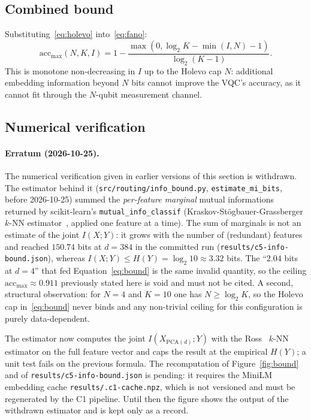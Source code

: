 \subsection{Combined bound}

Substituting~\eqref{eq:holevo} into~\eqref{eq:fano}:
\begin{equation}
\mathrm{acc}_\mathrm{max}(N, K, I) = 1 - \frac{\max(0, \log_2 K - \min(I, N) - 1)}{\log_2(K - 1)}.
\label{eq:bound}
\end{equation}
This is monotone non-decreasing in $I$ up to the Holevo cap $N$: additional
embedding information beyond $N$ bits cannot improve the VQC's accuracy, as
it cannot fit through the $N$-qubit measurement channel.

\subsection{Numerical verification}

\paragraph{Erratum (2026-10-25).} The numerical verification given in earlier
versions of this section is withdrawn. The estimator behind it
(\texttt{src/routing/info\_bound.py}, \texttt{estimate\_mi\_bits}, before
2026-10-25) summed the \emph{per-feature marginal} mutual informations
returned by scikit-learn's \texttt{mutual\_info\_classif}
(Kraskov-Stögbauer-Grassberger $k$-NN estimator~\cite{kraskov2004estimating},
applied one feature at a time). The sum of marginals is not an estimate of the
joint $I(X; Y)$: it grows with the number of (redundant) features and reached
$150.74$ bits at $d = 384$ in the committed run
(\texttt{results/c5-info-bound.json}), whereas $I(X; Y) \le H(Y) = \log_2 10
\approx 3.32$ bits. The ``$2.04$ bits at $d = 4$'' that fed
Equation~\eqref{eq:bound} is the same invalid quantity, so the ceiling
$\mathrm{acc}_\mathrm{max} \approx 0.911$ previously stated here is void and
must not be cited. A second, structural observation: for $N = 4$ and $K = 10$
one has $N \ge \log_2 K$, so the Holevo cap in~\eqref{eq:bound} never binds and
any non-trivial ceiling for this configuration is purely data-dependent.

The estimator now computes the joint $I(X_{\mathrm{PCA}(d)}; Y)$ with the
Ross~\cite{ross2014mutual} $k$-NN estimator on the full feature vector and caps
the result at the empirical $H(Y)$; a unit test fails on the previous formula.
The recomputation of Figure~\ref{fig:bound} and of
\texttt{results/c5-info-bound.json} is pending: it requires the MiniLM
embedding cache \texttt{results/.c1-cache.npz}, which is not versioned and must
be regenerated by the C1 pipeline. Until then the figure shows the output of the
withdrawn estimator and is kept only as a record.


